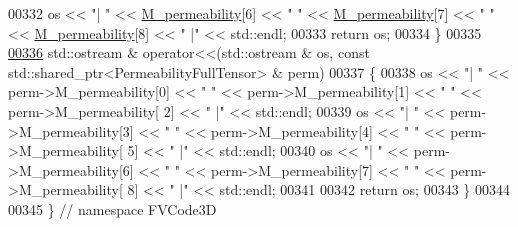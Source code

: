 \begin{DoxyCode}
00332     os << \textcolor{stringliteral}{"| "} << \hyperlink{classFVCode3D_1_1PermeabilityBase_aef595aa25abfeaf51e8d242e5de2055d}{M\_permeability}[6] << \textcolor{stringliteral}{" "} << \hyperlink{classFVCode3D_1_1PermeabilityBase_aef595aa25abfeaf51e8d242e5de2055d}{M\_permeability}[7] << \textcolor{stringliteral}{" "} << 
      \hyperlink{classFVCode3D_1_1PermeabilityBase_aef595aa25abfeaf51e8d242e5de2055d}{M\_permeability}[8] << \textcolor{stringliteral}{" |"} << std::endl;
00333     \textcolor{keywordflow}{return} os;
00334 \}
00335 
\hypertarget{Permeability_8cpp_source.tex_l00336}{}\hyperlink{namespaceFVCode3D_a453d7ae598d14867fe6f43774e38f8e0}{00336} std::ostream & operator<<(std::ostream & os, const std::shared\_ptr<PermeabilityFullTensor> & perm)
00337 \{
00338     os << \textcolor{stringliteral}{"| "} << perm->M\_permeability[0] << \textcolor{stringliteral}{" "} << perm->M\_permeability[1] << \textcolor{stringliteral}{" "} << perm->M\_permeability[
      2] << \textcolor{stringliteral}{" |"} << std::endl;
00339     os << \textcolor{stringliteral}{"| "} << perm->M\_permeability[3] << \textcolor{stringliteral}{" "} << perm->M\_permeability[4] << \textcolor{stringliteral}{" "} << perm->M\_permeability[
      5] << \textcolor{stringliteral}{" |"} << std::endl;
00340     os << \textcolor{stringliteral}{"| "} << perm->M\_permeability[6] << \textcolor{stringliteral}{" "} << perm->M\_permeability[7] << \textcolor{stringliteral}{" "} << perm->M\_permeability[
      8] << \textcolor{stringliteral}{" |"} << std::endl;
00341 
00342     \textcolor{keywordflow}{return} os;
00343 \}
00344 
00345 \} \textcolor{comment}{// namespace FVCode3D}
\end{DoxyCode}
